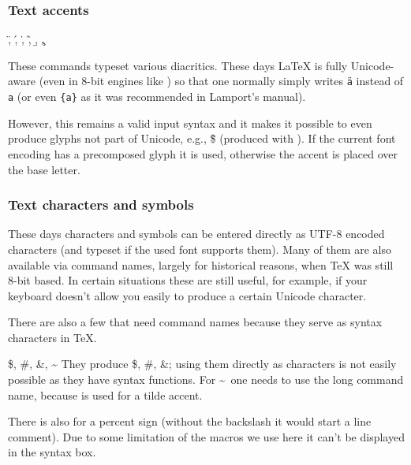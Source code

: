 \documentclass{l3in2edoc}
\begin{document}

\subsubsection{Text accents}

\begin{function}
  {
    \",
    \',
    \.,
    \~,
    \b,
    \c,
  }
  \begin{syntax}
  \end{syntax}
  These commands typeset various diacritics. These days \LaTeX{} is
  fully Unicode-aware (even in 8-bit engines like \pdfTeX{}) so that
  one normally simply writes \texttt{ä} instead of \texttt{a} (or even
  \texttt{\{a\}} as it was recommended in Lamport's manual).

  However, this remains a valid input syntax and it makes it possible
  to even produce glyphs not part of Unicode, e.g., \"\$ (produced
  with \cs{\$}). If the current font encoding has a precomposed
  glyph it is used, otherwise the accent is placed over the base
  letter.

\end{function}






\subsubsection{Text characters and symbols}

These days characters and symbols can be entered directly as UTF-8
encoded characters (and typeset if the used font supports them). Many
of them are also available via command names, largely for historical
reasons, when \TeX{} was still 8-bit based. In certain situations these
are still useful, for example, if your keyboard doesn't allow you
easily to produce a certain Unicode character.

There are also a few that need command names because they serve as
syntax characters in \TeX{}.

\begin{function}
  {
    \$,
    \#,
    \&,
    \textasciitilde
  }
%
  They produce \$, \#, \&; using them directly as characters is not
  easily possible as they have syntax functions. For
  \textasciitilde\ one needs to use the long command name, because
  \cs{~} is used for a tilde accent.

  There is also \cs{\%} for a percent sign (without the backslash it
  would start a line comment). Due to some limitation of the macros we
  use here it can't be displayed in the syntax box.

\end{function}
\end{document}
